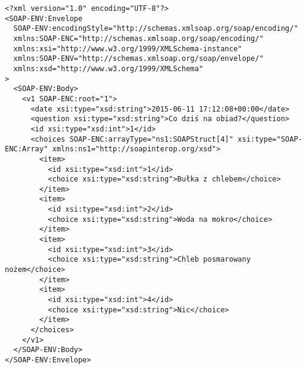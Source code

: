 \documentclass[12pt,a4paper]{article}
\begin{document}
\begin{verbatim}
<?xml version="1.0" encoding="UTF-8"?>
<SOAP-ENV:Envelope
  SOAP-ENV:encodingStyle="http://schemas.xmlsoap.org/soap/encoding/"
  xmlns:SOAP-ENC="http://schemas.xmlsoap.org/soap/encoding/"
  xmlns:xsi="http://www.w3.org/1999/XMLSchema-instance"
  xmlns:SOAP-ENV="http://schemas.xmlsoap.org/soap/envelope/"
  xmlns:xsd="http://www.w3.org/1999/XMLSchema"
>
  <SOAP-ENV:Body>
    <v1 SOAP-ENC:root="1">
      <date xsi:type="xsd:string">2015-06-11 17:12:08+00:00</date>
      <question xsi:type="xsd:string">Co dziś na obiad?</question>
      <id xsi:type="xsd:int">1</id>
      <choices SOAP-ENC:arrayType="ns1:SOAPStruct[4]" xsi:type="SOAP-ENC:Array" xmlns:ns1="http://soapinterop.org/xsd">
        <item>
          <id xsi:type="xsd:int">1</id>
          <choice xsi:type="xsd:string">Bułka z chlebem</choice>
        </item>
        <item>
          <id xsi:type="xsd:int">2</id>
          <choice xsi:type="xsd:string">Woda na mokro</choice>
        </item>
        <item>
          <id xsi:type="xsd:int">3</id>
          <choice xsi:type="xsd:string">Chleb posmarowany nożem</choice>
        </item>
        <item>
          <id xsi:type="xsd:int">4</id>
          <choice xsi:type="xsd:string">Nic</choice>
        </item>
      </choices>
    </v1>
  </SOAP-ENV:Body>
</SOAP-ENV:Envelope>
\end{verbatim}
\end{document}
